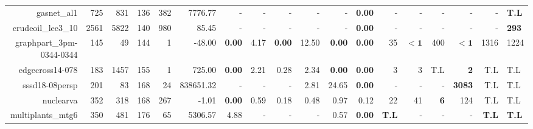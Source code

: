 \begin{table*}[t]
\begin{tabular}{|r|r|r|r|r||r||r|r|r|r|r||r|r|r|r|r|r|}
                       gasnet\_al1 &          725 &           831 &          136 &           382 &             7776.77 &              - &              - &             - &              - &             - & \textbf{0.00} &                  - &                  - &                  - &                  - &            - & \textbf{T.L} \\ 
                crudeoil\_lee3\_10 &         2561 &          5822 &          140 &           980 &               85.45 &              - &              - &             - &              - &             - & \textbf{0.00} &                  - &                  - &                  - &                  - &            - & \textbf{293} \\ 
          graphpart\_3pm-0344-0344 &          145 &            49 &          144 &             1 &              -48.00 &  \textbf{0.00} &           4.17 & \textbf{0.00} &          12.50 & \textbf{0.00} & \textbf{0.00} &                 35 &         $\bm{< 1}$ &                400 &         $\bm{< 1}$ &         1316 &         1224 \\ 
                   edgecross14-078 &          183 &          1457 &          155 &             1 &              725.00 &  \textbf{0.00} &           2.21 &          0.28 &           2.34 & \textbf{0.00} & \textbf{0.00} &                  3 &                  3 &                T.L &         \textbf{2} &          T.L &          T.L \\ 
                    sssd18-08persp &          201 &            83 &          168 &            24 &           838651.32 &              - &              - &             - &           2.81 &         24.65 & \textbf{0.00} &                  - &                  - &                  - &      \textbf{3083} &          T.L &          T.L \\ 
                         nuclearva &          352 &           318 &          168 &           267 &               -1.01 &  \textbf{0.00} &           0.59 &          0.18 &           0.48 &          0.97 &          0.12 &                 22 &                 41 &         \textbf{6} &                124 &          T.L &          T.L \\ 
                 multiplants\_mtg6 &          350 &           481 &          176 &            65 &             5306.57 &           4.88 &              - &             - &              - &          0.57 & \textbf{0.00} &       \textbf{T.L} &                  - &                  - &                  - & \textbf{T.L} & \textbf{T.L} \\ 

\end{tabular}
\end{table*}
